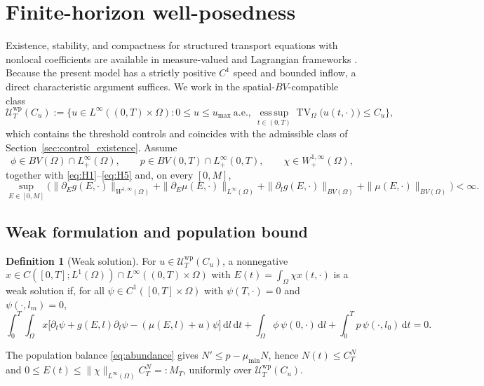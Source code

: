 \documentclass[pdflatex,sn-mathphys-num]{sn-jnl}
\newcommand{\Om}{\Omega}
\newcommand{\dd}{\,\mathrm{d}}
\DeclareMathOperator{\TV}{TV}
\theoremstyle{plain}
\theoremstyle{definition}
\newtheorem{definition}[theorem]{Definition}
\theoremstyle{remark}
\begin{document}
\section{Finite-horizon well-posedness}
\label{sec:wellposed}

Existence, stability, and compactness for structured transport equations with
nonlocal coefficients are available in measure-valued and Lagrangian frameworks
\cite{gwiazda2010structured,carrillo2012structured,
dull2021spaces}. Because the present model has a strictly
positive $C^1$ speed and bounded inflow, a direct characteristic argument
suffices. We work in the spatial-$BV$-compatible class
\[
\mathcal U_T^{\mathrm{wp}}(C_u)
:=
\Big\{
u\in L^\infty((0,T)\times\Om):
0\le u\le u_{\max}\ \text{a.e.},\
\operatorname*{ess\,sup}_{t\in(0,T)}\TV_\Om\big(u(t,\cdot)\big)\le C_u
\Big\},
\]
which contains the threshold controls and coincides with the admissible class of
Section~\ref{sec:control_existence}. Assume
\begin{equation}\label{eq:wp_data}
\phi\in BV(\Om)\cap L^\infty_+(\Om),
\qquad
p\in BV(0,T)\cap L^\infty_+(0,T),
\qquad
\chi\in W^{1,\infty}_+(\Om),
\end{equation}
together with \eqref{eq:H1}--\eqref{eq:H5} and, on every $[0,M]$,
\begin{equation}\label{eq:wp_coefficients}
\sup_{E\in[0,M]}
\Big(
\|\partial_Eg(E,\cdot)\|_{W^{1,\infty}(\Om)}
+\|\partial_E\mu(E,\cdot)\|_{L^\infty(\Om)}
+\|\partial_lg(E,\cdot)\|_{BV(\Om)}
+\|\mu(E,\cdot)\|_{BV(\Om)}
\Big)<\infty.
\end{equation}

\subsection{Weak formulation and population bound}
\label{subsec:weak_solution}

\begin{definition}[Weak solution]
\label{def:weak}
For $u\in\mathcal U_T^{\mathrm{wp}}(C_u)$, a nonnegative
$x\in C([0,T];L^1(\Om))\cap L^\infty((0,T)\times\Om)$ with
$E(t)=\int_\Om\chi x(t,\cdot)$ is a weak solution if, for all
$\psi\in C^1([0,T]\times\Om)$ with $\psi(T,\cdot)=0$ and $\psi(\cdot,l_m)=0$,
\[
\int_0^T\!\!\int_\Om
x\big[\partial_t\psi+g(E,l)\partial_l\psi-(\mu(E,l)+u)\psi\big]\dd l\dd t
+\int_\Om\phi\,\psi(0,\cdot)\dd l+\int_0^T p\,\psi(\cdot,l_0)\dd t=0.
\]
\end{definition}

The population balance \eqref{eq:abundance} gives $N'\le p-\mu_{\min}N$, hence
$N(t)\le C_T^N$ and $0\le E(t)\le\|\chi\|_{L^\infty(\Om)}C_T^N=:M_T$, uniformly
over $\mathcal U_T^{\mathrm{wp}}(C_u)$.
\end{document}
